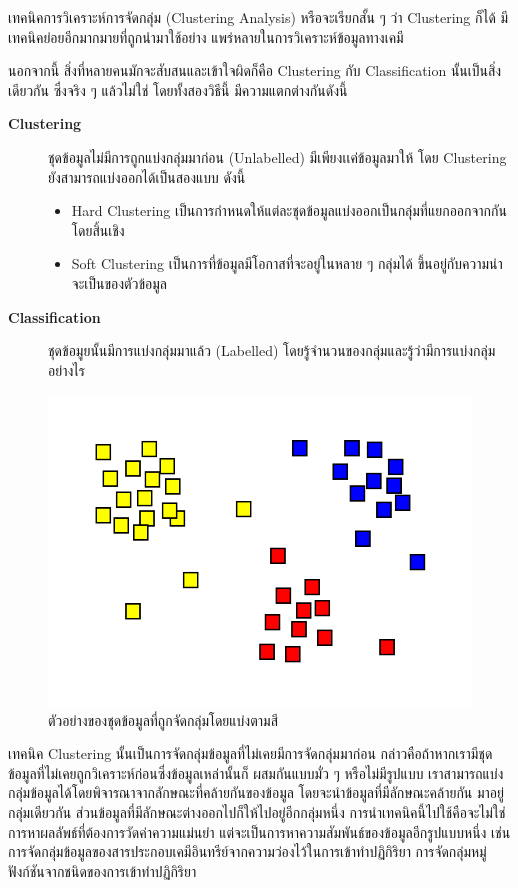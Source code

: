 เทคนิคการวิเคราะห์การจัดกลุ่ม (Clustering Analysis) หรือจะเรียกสั้น ๆ ว่า Clustering ก็ได้ มีเทคนิคย่อยอีกมากมายที่ถูกนำมาใช้อย่าง%
แพร่หลายในการวิเคราะห์ข้อมูลทางเคมี

นอกจากนี้ สิ่งที่หลายคนมักจะสับสนและเข้าใจผิดก็คือ Clustering กับ Classification นั้นเป็นสิ่งเดียวกัน ซึ่งจริง ๆ แล้วไม่ใช่ โดยทั้งสองวิธีนี้%
มีความแตกต่างกันดังนี้

\begin{description}
    \item[\textbf{Clustering}] ชุดข้อมูลไม่มีการถูกแบ่งกลุ่มมาก่อน (Unlabelled) มีเพียงเเค่ข้อมูลมาให้ โดย Clustering 
    ยังสามารถแบ่งออกได้เป็นสองแบบ ดังนี้
    \begin{itemize}
        \item Hard Clustering เป็นการกำหนดให้แต่ละชุดข้อมูลแบ่งออกเป็นกลุ่มที่แยกออกจากกันโดยสิ้นเชิง
        
        \item Soft Clustering เป็นการที่ข้อมูลมีโอกาสที่จะอยู่ในหลาย ๆ กลุ่มได้ ขึ้นอยู่กับความน่าจะเป็นของตัวข้อมูล
    \end{itemize}
    \item[\textbf{Classification}] ชุดข้อมูยนั้นมีการแบ่งกลุ่มมาแล้ว (Labelled) โดยรู้จำนวนของกลุ่มและรู้ว่ามีการแบ่งกลุ่มอย่างไร
\end{description}

\begin{figure}[H]
    \centering
    \includegraphics[width=0.8\linewidth]{fig/cluster.png}
    \caption{ตัวอย่างของชุดข้อมูลที่ถูกจัดกลุ่มโดยแบ่งตามสี}
    \label{fig:cluster}
\end{figure}

เทคนิค Clustering นั้นเป็นการจัดกลุ่มข้อมูลที่ไม่เคยมีการจัดกลุ่มมาก่อน กล่าวคือถ้าหากเรามีชุดข้อมูลที่ไม่เคยถูกวิเคราะห์ก่อนซึ่งข้อมูลเหล่านั้นก็%
ผสมกันแบบมั่ว ๆ หรือไม่มีรูปแบบ เราสามารถแบ่งกลุ่มข้อมูลได้โดยพิจารณาจากลักษณะที่คล้ายกันของข้อมูล โดยจะนำข้อมูลที่มีลักษณะคล้ายกัน%
มาอยู่กลุ่มเดียวกัน ส่วนข้อมูลที่มีลักษณะต่างออกไปก็ให้ไปอยู่อีกกลุ่มหนึ่ง การนำเทคนิคนี้ไปใช้คือจะไม่ใช่การหาผลลัพธ์ที่ต้องการวัดค่าความแม่นยำ 
แต่จะเป็นการหาความสัมพันธ์ของข้อมูลอีกรูปแบบหนึ่ง เช่น การจัดกลุ่มข้อมูลของสารประกอบเคมีอินทรีย์จากความว่องไว้ในการเข้าทำปฏิกิริยา 
การจัดกลุ่มหมู่ฟังก์ชันจากชนิดของการเข้าทำปฏิกิริยา

